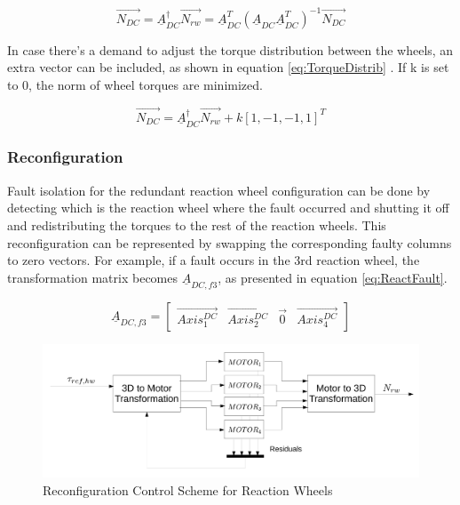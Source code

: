 \begin{equation}
\label{eq:motorTrans}
\vec{N_{DC}} =  \underline{A}_{DC} ^\dagger \vec{N_{rw}}   =  \underline{A}_{DC}^T  (\underline{A}_{DC} \underline{A}_{DC} ^T)^{-1} \vec{N_{DC}}
\end{equation}



In case there's a demand to adjust the torque distribution between the wheels, an extra vector can be included, as shown in equation \ref{eq:TorqueDistrib}
\cite[equation 18.41-42]{SADC}. If k is set to 0, the norm of wheel torques are minimized.

\begin{equation}
\label{eq:TorqueDistrib}
 \vec{N_{DC}} = \underline{A}^\dagger_{DC} \vec{N_{rw}}  + k\left[1,-1,-1,1\right]^T
\end{equation}


\subsubsection{Reconfiguration}

Fault isolation for the redundant reaction wheel configuration can be done by detecting which is the reaction wheel where the fault occurred and shutting it off and redistributing the torques to the rest of the reaction wheels. This reconfiguration can be represented by swapping the corresponding faulty columns to zero vectors. For example, if a fault occurs in the 3rd reaction wheel, the transformation matrix becomes $\underline{A}_{DC,f3}$, as presented in equation \ref{eq:ReactFault}.

\begin{equation}
\label{eq:ReactFault}
\underline{A}_{DC,f3} = \begin{bmatrix}
\vec{Axis^{DC}_{1}}       & \vec{Axis^{DC}_{2}}   & \vec{0}   & \vec{Axis^{DC}_{4}} 
\end{bmatrix} 
\end{equation}

\begin{figure}[h!]
	\centering 
	\includegraphics[width=170mm]{figures/reconfigure.pdf}	
	\caption{Reconfiguration Control Scheme for Reaction Wheels}
	\label{label{fig:reconfig}}
\end{figure}

